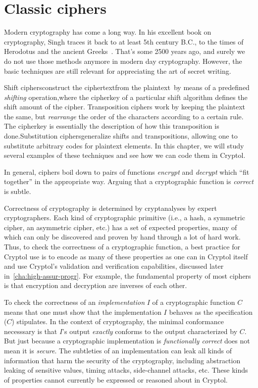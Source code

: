 \chapter{Classic ciphers}
\label{chapter:classic}

Modern cryptography has come a long way. In his excellent book on
cryptography, Singh traces it back to at least 5th century B.C., to
the times of Herodotus and the ancient Greeks~\cite{Singh:1999:CBE}.
That's some 2500 years ago, and surely we do not use those methods
anymore in modern day cryptography. However, the basic techniques are
still relevant for appreciating the art of secret writing.

Shift ciphers\indShiftcipher construct the \glosCiphertext
ciphertext\indCiphertext from the \glosPlaintext
plaintext\indPlaintext\ by means of a predefined {\em shifting}
operation,\glosCipherkey where the cipherkey of a particular shift
algorithm defines the shift amount of the cipher.\indCipherkey
Transposition ciphers work by keeping the plaintext the same, but {\em
  rearrange} the order of the characters according to a certain rule.
The cipherkey is essentially the description of how this transposition
is done.\indTranspositioncipher Substitution
ciphers\indSubstitutioncipher generalize shifts and transpositions,
allowing one to substitute arbitrary codes for plaintext elements.  In
this chapter, we will study several examples of these techniques and
see how we can code them in Cryptol.

In general, ciphers boil down to pairs of functions \emph{encrypt} and
\emph{decrypt} which ``fit together'' in the appropriate way.  Arguing
that a cryptographic function is \emph{correct} is subtle.

Correctness of cryptography is determined by cryptanalyses by expert
cryptographers.  Each kind of cryptographic primitive (i.e., a hash, a
symmetric cipher, an asymmetric cipher, etc.) has a set of expected
properties, many of which can only be discovered and proven by hand
through a lot of hard work.  Thus, to check the correctness of a
cryptographic function, a best practice for Cryptol use is to encode
as many of these properties as one can in Cryptol itself and use
Cryptol's validation and verification capabilities, discussed
later in~\autoref{cha:high-assur-progr}.  For example, the fundamental
property of most ciphers is that encryption and decryption are
inverses of each other.

To check the correctness of an \emph{implementation} $I$ of a
cryptographic function $C$ means that one must show that the
implementation $I$ behaves as the specification ($C$) stipulates.  In
the context of cryptography, the minimal conformance necesssary is
that $I$'s output \emph{exactly} conforms to the output characterized
by $C$.  But just because a cryptographic implementation is
\emph{functionally correct} does not mean it is \emph{secure}.  The
subtleties of an implementation can leak all kinds of information that
harm the security of the cryptography, including abstraction leaking
of sensitive values, timing attacks, side-channel attacks, etc.  These
kinds of properties cannot currently be expressed or reasoned about in
Cryptol.

